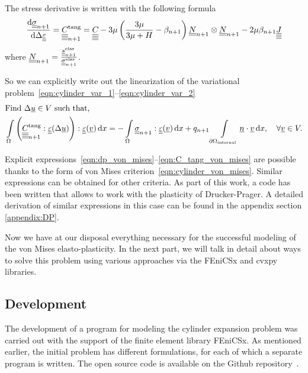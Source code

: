 \documentclass[12pt]{article}
\begin{document}
The stress derivative is written with the following formula
\begin{equation}
    \dfrac{\mathrm{d}\underline{\underline{\sigma}}_{n+1}}{\mathrm{d}\Delta\underline{\underline{\varepsilon}}} = \underline{\underline{\underline{\underline{C_{}}}}}_{n+1}^{\text{tang}} = \underline{\underline{\underline{\underline{C_{}}}}} - 3\mu \left( \frac{3\mu}{3\mu + H} -\beta_{n+1} \right) \underline{\underline{N}}_{n+1} \otimes \underline{\underline{N}}_{n+1} - 2\mu\beta_{n+1}\underline{\underline{\underline{\underline{J}}}} \label{eqn:C_tang_von_mises}
\end{equation}
where $\underline{\underline{N}}_{n+1} = \frac{\underline{\underline{s}}^\text{elas}_{n+1}}{\underline{\underline{\sigma}}_{n+1}^{\text{elas}}}$.

So we can explicitly write out the linearization of the variational problem~\eqref{eqn:cylinder_var_1}--\eqref{eqn:cylinder_var_2}
\begin{align}
    & \text{Find } \Delta\underline{u} \in V \text{ such that,} \label{eqn:cylinder_lin_var_from_1} \\ 
    & \int\limits_\Omega \left( \underline{\underline{\underline{\underline{C_{}}}}}_{n+1}^\text{tang} : \underline{\underline{\varepsilon}}(\Delta\underline{u}) \right) : \underline{\underline{\varepsilon}}(\underline{v}) \, \mathrm{d} x = -\int\limits_\Omega\underline{\underline{\sigma}}_{n+1} : \underline{\underline{\varepsilon}}(\underline{v}) \, \mathrm{d} x + q_{n+1}\int\limits_{\partial\Omega_\text{internal}}\underline{n} \cdot \underline{v} \, \mathrm{d} x, \quad \forall \underline{v} \in V. \label{eqn:cylinder_lin_var_from_2} 
\end{align}

Explicit expressions~\eqref{eqn:dp_von_mises}--\eqref{eqn:C_tang_von_mises} are possible thanks to the form of von Mises criterion~\eqref{eqn:cylinder_von_mises}. Similar expressions can be obtained for other criteria. As part of this work, a code has been written that allows to work with the plasticity of Drucker-Prager. A detailed derivation of similar expressions in this case can be found in the appendix section \ref{appendix:DP}.

Now we have at our disposal everything necessary for the successful modeling of the von Mises elasto-plasticity. In the next part, we will talk in detail about ways to solve this problem using various approaches via the FEniCSx and cvxpy libraries.

\subsection{Development}
\label{sec:development}

The development of a program for modeling the cylinder expansion problem was carried out with the support of the finite element library FEniCSx. As mentioned earlier, the initial problem has different formulations, for each of which a separate program is written. The open source code is available on the Github repository~\cite{convex-plasticity}. 
\end{document}
